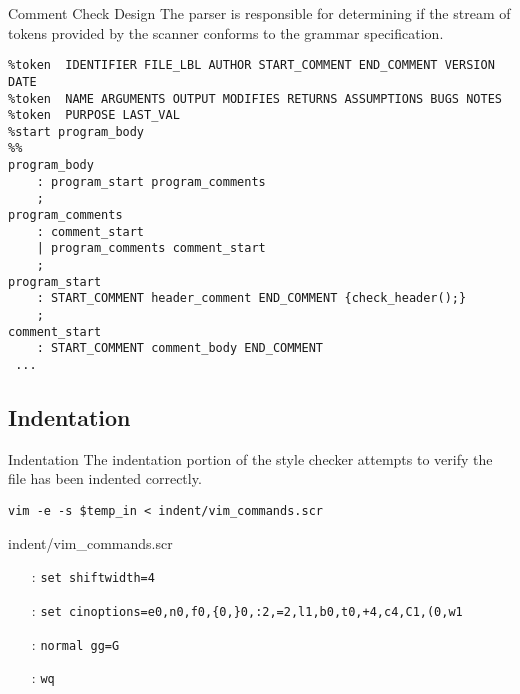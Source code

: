 \documentclass[compress]{beamer}
\begin{document}

\begin{frame}[containsverbatim]{Comment Check Design}
The parser is responsible for determining if the stream of tokens provided by the scanner conforms
to the grammar specification.
\scriptsize{\begin{verbatim}
%token  IDENTIFIER FILE_LBL AUTHOR START_COMMENT END_COMMENT VERSION DATE
%token  NAME ARGUMENTS OUTPUT MODIFIES RETURNS ASSUMPTIONS BUGS NOTES 
%token  PURPOSE LAST_VAL
%start program_body
%%
program_body
    : program_start program_comments
    ;
program_comments
    : comment_start
    | program_comments comment_start
    ;
program_start
    : START_COMMENT header_comment END_COMMENT {check_header();}
    ;
comment_start
    : START_COMMENT comment_body END_COMMENT
 ...
\end{verbatim}}
\end{frame}

\subsection{Indentation}
\begin{frame}[containsverbatim]{Indentation}
The indentation portion of the style checker attempts to verify the file has been indented correctly.
\begin{verbatim}
vim -e -s $temp_in < indent/vim_commands.scr
\end{verbatim}
\begin{exampleblock}{indent/vim\_commands.scr}
    \scriptsize{\begin{itemize}
        \item[:] \verb|set shiftwidth=4|
        \item[:] \verb|set cinoptions=e0,n0,f0,{0,}0,:2,=2,l1,b0,t0,+4,c4,C1,(0,w1|
        \item[:] \verb|normal gg=G|
        \item[:] \verb|wq|
    \end{itemize}}
\end{exampleblock}
\end{frame}

\end{document}
